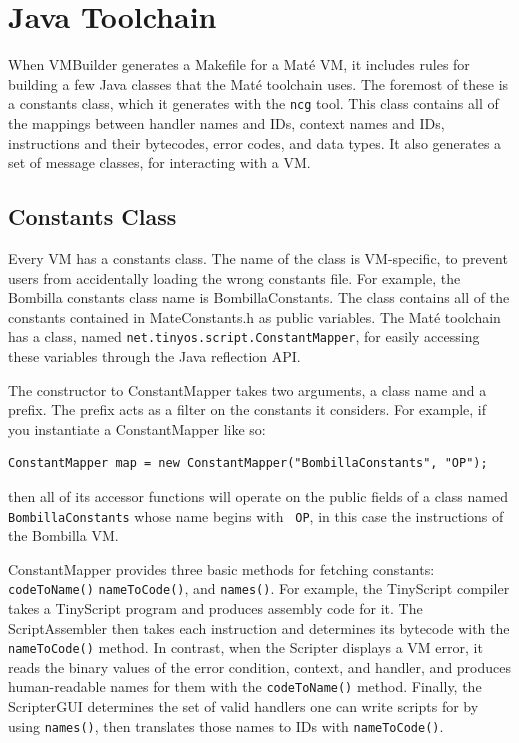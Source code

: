 \documentclass[12pt]{article}
\newcommand{\mate}{Mat\'{e}\xspace}
\begin{document}
\section{Java Toolchain}

When VMBuilder generates a Makefile for a \mate VM, it includes rules
for building a few Java classes that the \mate toolchain uses. The
foremost of these is a constants class, which it generates with the
{\tt ncg} tool. This class contains all of the mappings between
handler names and IDs, context names and IDs, instructions and their
bytecodes, error codes, and data types. It also generates a set of
message classes, for interacting with a VM.

\subsection{Constants Class}

Every VM has a constants class. The name of the class is VM-specific,
to prevent users from accidentally loading the wrong constants
file. For example, the Bombilla constants class name is
BombillaConstants. The class contains all of the constants contained
in MateConstants.h as public variables. The \mate toolchain has a
class, named {\tt net.tinyos.script.ConstantMapper}, for easily
accessing these variables through the Java reflection API.

The constructor to ConstantMapper takes two arguments, a class name
and a prefix. The prefix acts as a filter on the constants it
considers. For example, if you instantiate a ConstantMapper like so:

\begin{verbatim}
ConstantMapper map = new ConstantMapper("BombillaConstants", "OP");
\end{verbatim}

then all of its accessor functions will operate on the public fields
of a class named {\tt BombillaConstants} whose name begins with {\tt
OP}, in this case the instructions of the Bombilla VM.

ConstantMapper provides three basic methods for fetching constants:
{\tt codeToName()} {\tt nameToCode()}, and {\tt names()}. For example,
the TinyScript compiler takes a TinyScript program and produces
assembly code for it. The ScriptAssembler then takes each instruction
and determines its bytecode with the {\tt nameToCode()} method. In
contrast, when the Scripter displays a VM error, it reads the binary
values of the error condition, context, and handler, and produces
human-readable names for them with the {\tt codeToName()}
method. Finally, the ScripterGUI determines the set of valid handlers
one can write scripts for by using {\tt names()}, then translates
those names to IDs with {\tt nameToCode()}.
\end{document}
